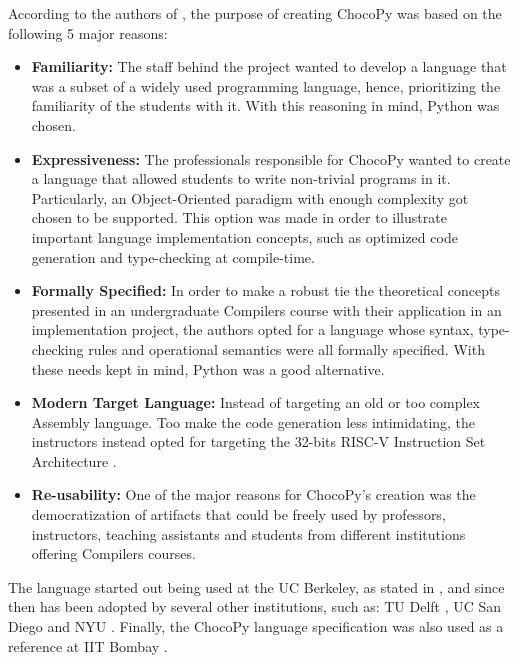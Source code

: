 \begin{itemize}
    According to the authors of \cite{padhye2019chocopy}, the purpose of creating ChocoPy was based on the following 5 major reasons:
    \begin{itemize}
        \item \textbf{Familiarity:} The staff behind the project wanted to develop a language that was a subset of a widely used programming language, hence, prioritizing the familiarity of the students with it. With this reasoning in mind, Python \cite{python_language} was chosen.
        \item \textbf{Expressiveness:} The professionals responsible for ChocoPy wanted to create a language that allowed students to write non-trivial programs in it. Particularly, an Object-Oriented paradigm with enough complexity got chosen to be supported. This option was made in order to illustrate important language implementation concepts, such as optimized code generation and type-checking at compile-time. 
        \item \textbf{Formally Specified:} In order to make a robust tie the theoretical concepts presented in an undergraduate Compilers course with their application in an implementation project, the authors opted for a language whose syntax, type-checking rules and operational semantics were all formally specified. With these needs kept in mind, Python was a good alternative.
        \item \textbf{Modern Target Language:} Instead of targeting an old or too complex Assembly language. Too make the code generation less intimidating, the instructors instead opted for targeting the 32-bits RISC-V Instruction Set Architecture \cite{riscv_instruction_set_manual}.
        \item \textbf{Re-usability:} One of the major reasons for ChocoPy's creation was the democratization of artifacts that could be freely used by professors, instructors, teaching assistants and students from different institutions offering Compilers courses.
    \end{itemize}

    The language started out being used at the UC Berkeley, as stated in \cite{padhye2019chocopy}, and since then has been adopted by several other institutions, such as: TU Delft \cite{tu_delft_cs4200_2020_compiler_construction_course_page}, UC San Diego \cite{uc_san_diego_cse213_winter2021_advanced_compiler_design_course_page} and NYU \cite{nyu_2020_compiler_construction_course_page}. Finally, the ChocoPy language specification was also used as a reference at IIT Bombay \cite{iit_bombay_sclp}.


\end{itemize}
